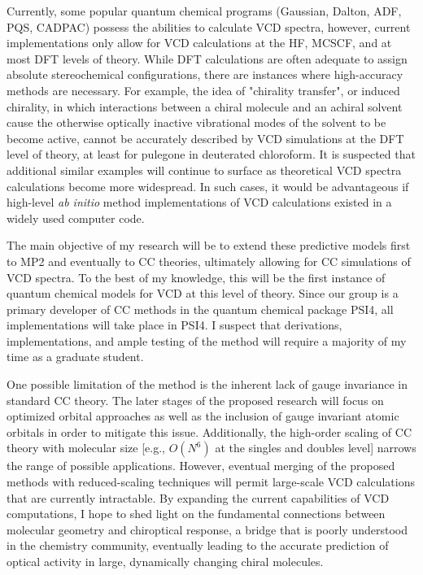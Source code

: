     Currently, some popular quantum chemical programs (Gaussian, Dalton, ADF, PQS, CADPAC) possess the abilities to calculate VCD spectra, however, current implementations only allow for VCD calculations at the HF, MCSCF, and at most DFT levels of theory. While DFT calculations are often adequate to assign absolute stereochemical configurations, there are instances where high-accuracy methods are necessary. For example, the idea of "chirality transfer", or induced chirality, in which interactions between a chiral molecule and an achiral solvent cause the otherwise optically inactive vibrational modes of the solvent to be become active, cannot be accurately described by VCD simulations at the DFT level of theory, at least for pulegone in deuterated chloroform\cite{Debie2008,Nicu2009}. It is suspected that additional similar examples will continue to surface as theoretical VCD spectra calculations become more widespread. In such cases, it would be advantageous if high-level \textit{ab initio} method implementations of VCD calculations existed in a widely used computer code. 

    The main objective of my research will be to extend these predictive models first to MP2 and eventually to CC theories, ultimately allowing for CC simulations of VCD spectra. To the best of my knowledge, this will be the first instance of quantum chemical models for VCD at this level of theory. Since our group is a primary developer of CC methods in the quantum chemical package PSI4, all implementations will take place in PSI4. I suspect that derivations, implementations, and ample testing of the method will require a majority of my time as a graduate student. 
    
    One possible limitation of the method is the inherent lack of gauge invariance in standard CC theory. The later stages of the proposed research will focus on optimized orbital approaches as well as the inclusion of gauge invariant atomic orbitals in order to mitigate this issue. Additionally, the high-order scaling of CC theory with molecular size [e.g., $O(N^6)$ at the singles and doubles level] narrows the range of possible applications. However, eventual merging of the proposed methods with reduced-scaling techniques will permit large-scale VCD calculations that are currently intractable. By expanding the current capabilities of VCD computations, I hope to shed light on the fundamental connections between molecular geometry and chiroptical response, a bridge that is poorly understood in the chemistry community, eventually leading to the accurate prediction of optical activity in large, dynamically changing chiral molecules.
